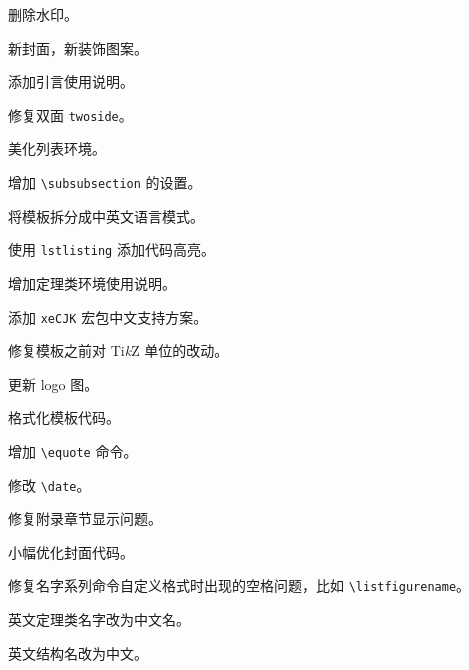 \documentclass[lang=cn,10pt]{elegantbook}
\begin{document}

\begin{change}
  \item 删除水印。
  \item 新封面，新装饰图案。
  \item 添加引言使用说明。
  \item 修复双面 \lstinline{twoside}。
  \item 美化列表环境。
  \item 增加 \lstinline{\subsubsection} 的设置。
  \item 将模板拆分成中英文语言模式。
  \item 使用 \lstinline{lstlisting} 添加代码高亮。
  \item 增加定理类环境使用说明。
\end{change}


\begin{change}
  \item 添加 \lstinline{xeCJK} 宏包中文支持方案。
  \item 修复模板之前对 Ti\textit{k}Z 单位的改动。
  \item 更新 logo 图。
\end{change}


\begin{change}
  \item 格式化模板代码。
  \item 增加 \lstinline{\equote} 命令。
  \item 修改 \lstinline{\date}。
\end{change}


\begin{change}
  \item 修复附录章节显示问题。
  \item 小幅优化封面代码。
\end{change}


\begin{change}
  \item 修复名字系列命令自定义格式时出现的空格问题，比如 \lstinline{\listfigurename}。
  \item 英文定理类名字改为中文名。
  \item 英文结构名改为中文。
\end{change}
\end{document}
